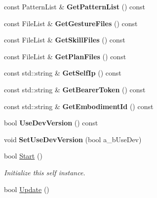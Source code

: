 \begin{DoxyCompactItemize}
const Pattern\+List \& {\bfseries Get\+Pattern\+List} () const
\item 
\mbox{\label{class_self_instance_a47cf283cb69769d3bd0aa469b977945e}} 
const File\+List \& {\bfseries Get\+Gesture\+Files} () const
\item 
\mbox{\label{class_self_instance_a87a36c016e988030d771b10aa673f5b0}} 
const File\+List \& {\bfseries Get\+Skill\+Files} () const
\item 
\mbox{\label{class_self_instance_a402767301eaead3db955cb240b1adcb6}} 
const File\+List \& {\bfseries Get\+Plan\+Files} () const
\item 
\mbox{\label{class_self_instance_a7a43b2665d6ca29bb5db75cce5e619e2}} 
const std\+::string \& {\bfseries Get\+Self\+Ip} () const
\item 
\mbox{\label{class_self_instance_aaab7ca594af75546caf16b7b185fded0}} 
const std\+::string \& {\bfseries Get\+Bearer\+Token} () const
\item 
\mbox{\label{class_self_instance_ab31d6e62e7ab2f82c22c4b921a6d0b5e}} 
const std\+::string \& {\bfseries Get\+Embodiment\+Id} () const
\item 
\mbox{\label{class_self_instance_a8a2e9ff4f47092a7059bffec2a8deca8}} 
bool {\bfseries Use\+Dev\+Version} () const
\item 
\mbox{\label{class_self_instance_a97cf05723d5aedca5a019ffa18a3fd76}} 
void {\bfseries Set\+Use\+Dev\+Version} (bool a\+\_\+b\+Use\+Dev)
\item 
\mbox{\label{class_self_instance_ade726e276fbba8797abe0149a1a847f6}} 
bool \hyperlink{class_self_instance_ade726e276fbba8797abe0149a1a847f6}{Start} ()
\begin{DoxyCompactList}\small\item\em Initialize this self instance. \end{DoxyCompactList}\item 
bool \hyperlink{class_self_instance_aab86fc32f63c281ad897215e0b54631e}{Update} ()

\end{DoxyCompactItemize}
